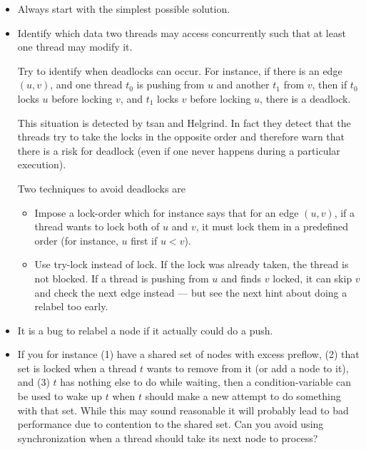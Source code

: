 \documentclass{forsete}
\begin{document}
{\begin{itemize}
One year a group of two very good students made a quite complex Java 
solution which had a bug. Instead of helping them, I suggested they should
re-implement the bug for the next week's lab on C. They did and could solve
the problem almost immediately using Helgrind (and immediately fix the Java program as well).

\item Always start with the simplest possible solution.

\item Identify which data two threads may access concurrently such that at
least one thread may modify it.

Try to identify when deadlocks can occur. For instance, if there is
an edge $(u,v)$, and one thread $t_0$ is pushing from $u$ and another $t_1$
from $v$, then if $t_0$ locks $u$ before locking $v$, and $t_1$ 
locks $v$ before locking $u$, there is a deadlock.

This situation is detected by tsan and Helgrind. In fact they detect
that the threads try to take the locks in the opposite order and therefore
warn that there is a risk for deadlock (even if one never happens during
a particular execution).

Two techniques to avoid deadlocks are 
\begin{itemize}
\item Impose a lock-order which for instance says that for an edge $(u,v)$,
if a thread wants to lock both of $u$ and $v$, it must lock them in a
predefined order (for instance, $u$ first if $u < v$).
\item Use try-lock instead of lock. If the lock was already taken,
the thread is not blocked. If a thread is pushing from $u$ and finds $v$
locked, it can skip $v$ and check the next edge instead --- but see the
next hint about doing a relabel too early.
\end{itemize}

\item It is a bug to relabel a node if it actually could do a push.

\item If you for instance (1) have a shared set of nodes with excess 
preflow, (2) that set is locked when a thread $t$ wants to remove from it (or
add a node to it), and (3) $t$ has nothing else to do while waiting,
then a condition-variable can be used to wake up $t$ when $t$ should make
a new attempt to do something with that set. While this may sound reasonable
it will probably lead to bad performance due to contention to the shared set.
Can you avoid using synchronization when a thread should take its next node
to process?
\end{itemize}

}
\end{document}
